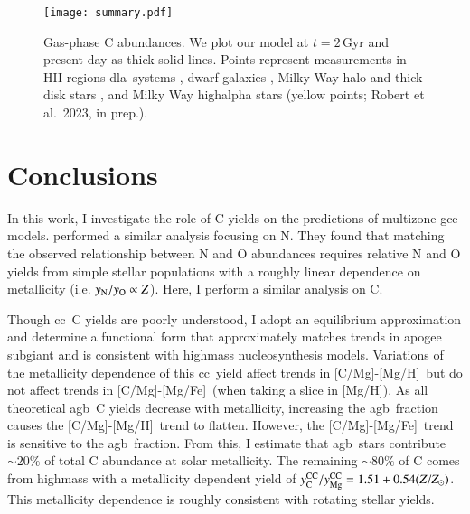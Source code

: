 \documentclass[12pt,oneside,letterpaper]{report}
\newcommand{\cc}{\gls{cc}}
\newcommand{\agb}{\gls{agb}}
\newcommand{\dla}{\gls{dla}}
\newcommand{\gce}{\gls{gce}}
\newcommand{\apogee}{\gls{apogee}}
\newcommand{\citealtjack}{Robert et al.~2023, in prep.}
\newcommand{\caah}{[C/Mg]-[Mg/H]}
\newcommand{\caafe}{[C/Mg]-[Mg/Fe]}
\newcommand{\Ycc}{\ensuremath{y_{\rm C}^{\rm CC}}}
\newcommand{\Yoc}{\ensuremath{y_{\rm Mg}^{\rm CC}}}
\newcommand{\about}[1]{${\sim} #1$}
\begin{document}
\begin{figure}[htp]
\centering
\texttt{[image: summary.pdf]}
\caption[Gas-Phase Abundances]{Gas-phase C abundances. We plot our model at $t=2$\,Gyr and present day as thick solid lines. Points represent measurements in 
    HII regions    \citep[pink circles;][]{skillman+20, esteban+02, esteban+09, esteban+14, esteban+19}
    \dla\ systems \citep[blue triangles;][]{ellison+10, srianand+10, dutta+14, DZ+03, pettini+08, morrison+16,cooke+17},  %
    dwarf galaxies \citep[red diamonds;][]{berg+19},
    Milky Way halo and thick disk stars \citep[green stars;][]{nissen+14, fabbian+09},
    and Milky Way \gls{highalpha} stars (yellow points; \citealtjack).
}
\label{fig:gas_phase}
\end{figure}


\chapter{Conclusions}

In this work, I investigate the role of C yields on the predictions of \gls{multizone} \gce{} models. \citet{james+23} performed a similar analysis focusing on N. They found that matching the observed relationship between N and O abundances \citep{HEK00,PVT10,berg+12, berg+20, skillman+20, izotov+12, james2+15, dopita+16} requires relative N and O yields from simple stellar populations with a roughly linear dependence on metallicity (i.e. $y_{\rm N}/y_{\rm O} \propto Z$). 
Here, I perform a similar analysis on C. 

Though \cc\ C yields are poorly understood, I adopt an equilibrium approximation and determine a functional form that approximately matches trends in \apogee{} \gls{subgiant} and is consistent with \gls{highmass} \gls{nucleosynthesis} models. Variations of the metallicity dependence of this \cc\ yield affect trends in \caah~but do not affect trends in \caafe\ (when taking a slice in [Mg/H]). As all theoretical \agb\ C yields decrease with metallicity, increasing the \agb\ fraction causes the \caah\ trend to flatten. However, the \caafe\ trend is sensitive to the \agb\ fraction. 
From this, I estimate that \agb\ stars contribute \about{20\%} of total C abundance at solar metallicity. The remaining \about{80\%} of C comes from \gls{highmass} with a metallicity dependent yield of $\Ycc/\Yoc=1.51 + 0.54 (Z/Z_\odot)$. 
This metallicity dependence is roughly consistent with rotating stellar yields.
 
\end{document}
